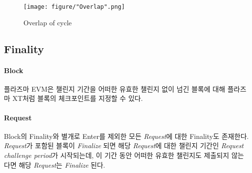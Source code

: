 \documentclass[letterpaper, 11pt]{article}
\begin{document}
\begin{figure}[!h]
\centering
\texttt{[image: figure/"Overlap".png]}
\caption{Overlap of cycle}
\label{fig:overlap-of-cycle}
\end{figure}

\subsection{Finality}
\begin{CJK}{UTF8}{mj}
\paragraph{Block} 플라즈마 EVM은 챌린지 기간을 어떠한 유효한 챌린지 없이 넘긴 블록에 대해 플라즈마 XT처럼 블록의 체크포인트를 지정할 수 있다.

\paragraph{Request} Block의 Finality와 별개로 Enter를 제외한 모든 \emph{Request}에 대한 Finality도 존재한다. \emph{Request}가 포함된 블록이 \emph{Finalize} 되면 해당 \emph{Request}에 대한 챌린지 기간인 \emph{Request challenge period}가 시작되는데, 이 기간 동안 어떠한 유효한 챌린지도 제출되지 않는다면 해당 \emph{Request}는 \emph{Finalize} 된다.
\end{CJK}

\end{document}
